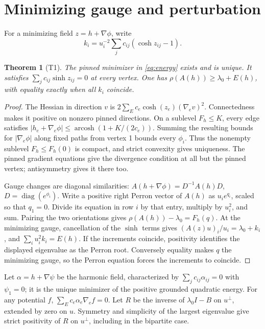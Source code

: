 \documentclass[11pt]{article}
\newtheorem{theorem}{Theorem}
\DeclareMathOperator{\arcosh}{arcosh}
\DeclareMathOperator{\diag}{diag}
\begin{document}
\section{Minimizing gauge and perturbation}
For a minimizing field \(z=h+\nabla\phi\), write
\[
 k_i=u_i^{-2}\sum_j c_{ij}(\cosh z_{ij}-1).
\]
\begin{theorem}[T1]
The pinned minimizer in \eqref{eq:energy} exists and is unique. It satisfies
\(\sum_j c_{ij}\sinh z_{ij}=0\) at every vertex.
One has \(\rho(A(h))\geq\lambda_0+E(h)\), with equality exactly when all
\(k_i\) coincide.
\end{theorem}
\begin{proof}
The Hessian in direction \(v\) is
\(2\sum_E c_e\cosh(z_e)(\nabla_e v)^2\). Connectedness makes it positive
on nonzero pinned directions. On a sublevel \(F_h\leq K\), every edge
satisfies \(|h_e+\nabla_e\phi|\leq\arcosh(1+K/(2c_e))\). Summing the
resulting bounds for \(|\nabla_e\phi|\) along fixed paths from vertex 1
bounds every \(\phi_i\). Thus the nonempty sublevel \(F_h\leq F_h(0)\)
is compact, and strict convexity gives uniqueness. The pinned gradient
equations give the divergence condition at all but the pinned vertex;
antisymmetry gives it there too.

Gauge changes are diagonal similarities:
\(A(h+\nabla\phi)=D^{-1}A(h)D\), \(D=\diag(e^{\phi_i})\).
Write a positive right Perron vector of \(A(h)\) as \(u_i e^{q_i}\),
scaled so that \(q_1=0\). Divide its equation in row \(i\) by that
entry, multiply by \(u_i^2\), and sum. Pairing the two orientations
gives \(\rho(A(h))-\lambda_0=F_h(q)\).
At the minimizing gauge, cancellation of the \(\sinh\) terms gives
\((A(z)u)_i/u_i=\lambda_0+k_i\), and \(\sum_i u_i^2 k_i=E(h)\).
If the increments coincide, positivity identifies the displayed
eigenvalue as the Perron root. Conversely equality makes \(q\) the
minimizing gauge, so the Perron equation forces the increments to coincide.
\end{proof}

Let \(\alpha=h+\nabla\psi\) be the harmonic field, characterized by
\(\sum_j c_{ij}\alpha_{ij}=0\) with \(\psi_1=0\); it is the unique
minimizer of the positive grounded quadratic energy.
For any potential \(f\), \(\sum_E c_e\alpha_e\nabla_e f=0\).
Let \(R\) be the inverse of \(\lambda_0 I-B\) on \(u^\perp\), extended
by zero on \(u\). Symmetry and simplicity of the largest eigenvalue give
strict positivity of \(R\) on \(u^\perp\), including in the bipartite case.
\end{document}
